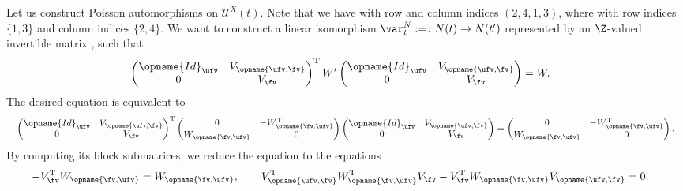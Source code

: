 \documentclass[pdftex]{sigma}
\newcommand{\XClAlg}{\mathcal{U}^X}
\newcommand{\Id}{{\opname{Id}}}
\newcommand{\high}{\opname{\ufv,\fv}}
\newcommand{\low}{\opname{\fv,\ufv}}
\numberwithin{equation}{section}
\begin{document}
\begin{Example}
Let us construct Poisson automorphisms on $\XClAlg(t)$. Note that
we have \smash{$W=\left(\begin{smallmatrix}
0 & -W_{\low}^{\rm T}\\
W_{\low} & 0
\end{smallmatrix}\right)$} with row and column indices $(2,4,1,3)$, where \smash{$W_{\low}=\left(\begin{smallmatrix}
1 & -1\\
-1 & 1
\end{smallmatrix}\right)$} with row indices $\{1,3\}$ and column indices $\{2,4\}$. We want
to construct a linear isomorphism $\var_{t}^{N}:=\colon N(t)\rightarrow N(t')$
represented by an $\Z$-valued invertible matrix \smash{$\left(\begin{smallmatrix}
\Id_{\ufv} & V_{\high}\\
0 & V_{\fv}
\end{smallmatrix}\right)$}, such that
\begin{align*}
\begin{pmatrix}
\Id_{\ufv} & V_{\high}\\
0 & V_{\fv}
\end{pmatrix}^{\rm T}W'\begin{pmatrix}
\Id_{\ufv} & V_{\high}\\
0 & V_{\fv}
\end{pmatrix} & =W.
\end{align*}
The desired equation is equivalent to
\begin{align*}
-\begin{pmatrix}
\Id_{\ufv} & V_{\high}\\
0 & V_{\fv}
\end{pmatrix}^{\rm T}\begin{pmatrix}
0 & -W_{\low}^{\rm T}\\
W_{\low} & 0
\end{pmatrix}\begin{pmatrix}
\Id_{\ufv} & V_{\high}\\
0 & V_{\fv}
\end{pmatrix} & =\begin{pmatrix}
0 & -W_{\low}^{\rm T}\\
W_{\low} & 0
\end{pmatrix}.
\end{align*}
By computing its block submatrices, we reduce the equation to the
equations
\begin{align*}
-V_{\fv}^{\rm T}W_{\low} & =W_{\low},\qquad
V_{\high}^{\rm T}W_{\low}^{\rm T}V_{\fv}-V_{\fv}^{\rm T}W_{\low}V_{\high} =0.
\end{align*}


\end{Example}
\end{document}
